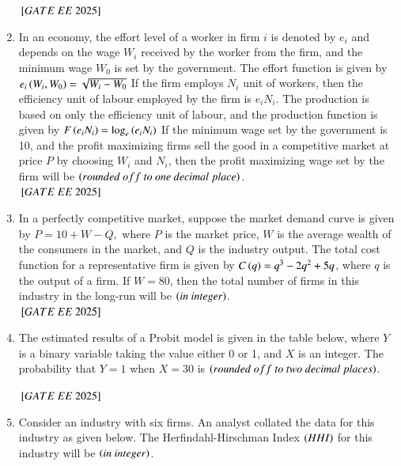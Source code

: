 \documentclass[journal,12pt,onecolumn]{IEEEtran}
\theoremstyle{remark}
\begin{document}
\begin{enumerate}
\begin{center}
\end{center}
 \hfill ${}\left[GATE\ EE\ 2025\right]$
\item In an economy, the effort level of a worker in firm $i$ is denoted by $e_i$ and depends on the wage $W_i$ received by the worker from the firm, and the minimum wage $W_0$ is set by the government. The effort function is given by 
$
e_i\left(W_i, W_0\right) = \sqrt{W_i - W_0}
$
If the firm employs $N_i$ unit of workers, then the efficiency unit of labour employed by the firm is $e_i N_i$. The production is based on only the efficiency unit of labour, and the production function is given by
$
F\left(e_i N_i\right) = \log_e \left(e_i N_i\right)
$
If the minimum wage set by the government is 10, and the profit maximizing firms sell the good in a competitive market at price $P$ by choosing $W_i$ and $N_i$, then the profit maximizing wage set by the firm will be \underline{\hspace{2cm}} $\brak{rounded\ off\ to\ one\ decimal\ place}$.\\
 \hfill ${}\left[GATE\ EE\ 2025\right]$
\item In a perfectly competitive market, suppose the market demand curve is given by 
$
P = 10 + W - Q,
$
where $P$ is the market price, $W$ is the average wealth of the consumers in the market, and $Q$ is the industry output. The total cost function for a representative firm is given by $C\left(q\right) = q^3 - 2q^2 + 5q$, where $q$ is the output of a firm. If $W = 80$, then the total number of firms in this industry in the long-run will be \underline{\hspace{2cm}} $\left(in\ integer\right)$.
\\
 \hfill ${}\left[GATE\ EE\ 2025\right]$
\item The estimated results of a Probit model is given in the table below, where $Y$ is a binary variable taking the value either 0 or 1, and $X$ is an integer. The probability that $Y = 1$ when $X = 30$ is \underline{\hspace{2cm}} $\brak{rounded\ off \ to \ two\ decimal\ places}$. \\

\begin{center}

\end{center}
 \hfill ${}\left[GATE\ EE\ 2025\right]$
\item Consider an industry with six firms. An analyst collated the data for this industry as given below. The Herfindahl-Hirschman Index $\left(HHI\right)$ for this industry will be \underline{\hspace{2cm}} $\left(in\ integer\right)$.
\begin{center}

\end{center}
\end{enumerate}
\end{document}
